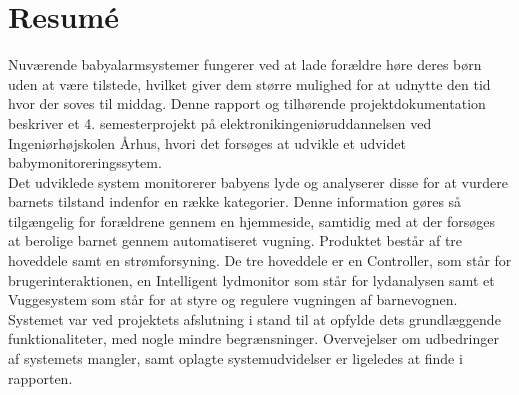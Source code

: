 \chapter{Resumé}

Nuværende babyalarmsystemer fungerer ved at lade forældre høre deres børn uden at være tilstede, hvilket giver dem større mulighed for at udnytte den tid hvor der soves til middag.
Denne rapport og tilhørende projektdokumentation beskriver et 4. semesterprojekt på elektronikingeniøruddannelsen ved Ingeniørhøjskolen Århus, hvori det forsøges at udvikle et udvidet babymonitoreringssytem.\\
Det udviklede system monitorerer babyens lyde og analyserer disse for at vurdere barnets tilstand indenfor en række kategorier. Denne information gøres så tilgængelig for forældrene gennem en hjemmeside, samtidig med at der forsøges at berolige barnet gennem automatiseret vugning.
Produktet består af tre hoveddele samt en strømforsyning. De tre hoveddele er en Controller, som står for brugerinteraktionen, en Intelligent lydmonitor som står for lydanalysen samt et Vuggesystem som står for at styre og regulere vugningen af barnevognen. \\
Systemet var ved projektets afslutning i stand til at opfylde dets grundlæggende funktionaliteter, med nogle mindre begrænsninger. Overvejelser om udbedringer af systemets mangler, samt oplagte systemudvidelser er ligeledes at finde i rapporten.\\

%
%
%
